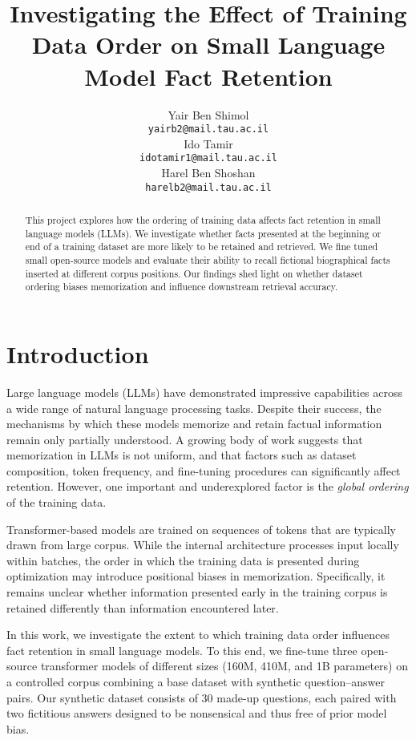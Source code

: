 \documentclass[11pt]{article}
\title{Investigating the Effect of Training Data Order on Small Language Model Fact Retention}
\author{
    Yair Ben Shimol \\
    \texttt{yairb2@mail.tau.ac.il} \\
    \And
    Ido Tamir \\
    \texttt{idotamir1@mail.tau.ac.il} \\
    \And
    Harel Ben Shoshan \\
    \texttt{harelb2@mail.tau.ac.il}
}
\begin{document}
    \maketitle

    \begin{abstract}
        This project explores how the ordering of training data affects fact retention in small language models (LLMs). We investigate whether facts presented at the beginning or end of a training dataset are more likely to be retained and retrieved. We fine tuned small open-source models and evaluate their ability to recall fictional biographical facts inserted at different corpus positions. Our findings shed light on whether dataset ordering biases memorization and influence downstream retrieval accuracy.
    \end{abstract}

    \section{Introduction}

    Large language models (LLMs) have demonstrated impressive capabilities across a wide range of natural language processing tasks. Despite their success, the mechanisms by which these models memorize and retain factual information remain only partially understood. A growing body of work suggests that memorization in LLMs is not uniform, and that factors such as dataset composition, token frequency, and fine-tuning procedures can significantly affect retention. However, one important and underexplored factor is the \textit{global ordering} of the training data.

    Transformer-based models are trained on sequences of tokens that are typically drawn from large corpus. While the internal architecture processes input locally within batches, the order in which the training data is presented during optimization may introduce positional biases in memorization. Specifically, it remains unclear whether information presented early in the training corpus is retained differently than information encountered later.

    In this work, we investigate the extent to which training data order influences fact retention in small language models. To this end, we fine-tune three open-source transformer models of different sizes (160M, 410M, and 1B parameters) on a controlled corpus combining a base dataset with synthetic question–answer pairs. Our synthetic dataset consists of 30 made-up questions, each paired with two fictitious answers designed to be nonsensical and thus free of prior model bias.
\end{document}
